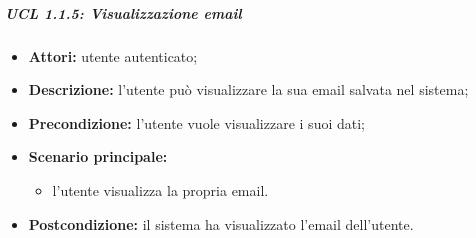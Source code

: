 \iffalse %
\subparagraph{UCL 1.1.5: Visualizzazione numero di telefono}
\begin{itemize}
	\item \textbf{Attori:} utente autenticato;
	\item \textbf{Descrizione:} l'utente può visualizzare il numero di telefono salvato nel sistema;
	\item \textbf{Precondizione:} l'utente vuole visualizzare i suoi dati;
	\item \textbf{Scenario principale:}
	\begin{itemize}
	 \item l'utente visualizza il proprio numero di telefono.
	\end{itemize}
	\item \textbf{Postcondizione:} il sistema ha visualizzato il numero di telefono dell'utente.
\end{itemize}
\fi

\subparagraph{UCL 1.1.5: Visualizzazione email}
\begin{itemize}
	\item \textbf{Attori:} utente autenticato;
	\item \textbf{Descrizione:} l'utente può visualizzare la sua email salvata nel sistema;
	\item \textbf{Precondizione:} l'utente vuole visualizzare i suoi dati;
	\item \textbf{Scenario principale:}
	\begin{itemize}
	 \item l'utente visualizza la propria email.
	\end{itemize}
	\item \textbf{Postcondizione:} il sistema ha visualizzato l'email dell'utente.
\end{itemize}

